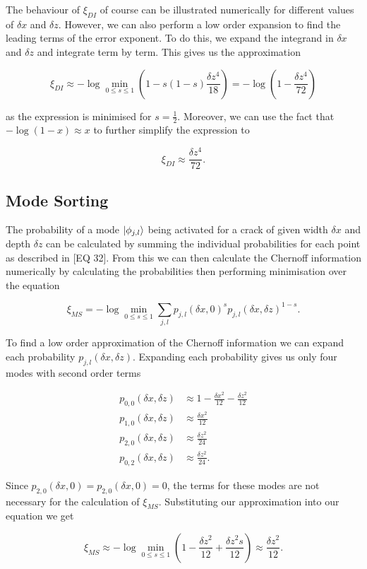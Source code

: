 \documentclass{article}
\begin{document}
The behaviour of $\xi_{DI}$ of course can be illustrated numerically for different values of $\delta x$ and $\delta z$.
However, we can also perform a low order expansion to find the leading terms of the error exponent.
To do this, we expand the integrand in $\delta x$ and $\delta z$ and integrate term by term.
This gives us the approximation

\begin{equation}
\xi_{DI} \approx - \log \min_{0 \leq s \leq 1} \left( 1 - s(1-s) \frac{\delta z^4}{18}\right) = -\log \left(1 - \frac{\delta z^4}{72} \right)
\end{equation}

as the expression is minimised for $s = \frac{1}{2}$.
Moreover, we can use the fact that $-\log(1-x) \approx x$ to further simplify the expression to

\begin{equation}
\xi_{DI} \approx \frac{\delta z^4}{72}.
\end{equation}

\subsection*{Mode Sorting}

The probability of a mode $\ket{\phi_{j,l}}$ being activated for a crack of given width $\delta x$ and depth $\delta z$ can be calculated by summing the individual probabilities for each point as described in [EQ 32]. From this we can then calculate the Chernoff information numerically by calculating the probabilities then performing minimisation over the equation

\begin{equation}
\xi_{MS} = -\log \min_{0 \leq s \leq 1} \sum_{j,l} p_{j,l}(\delta x, 0)^s p_{j,l}(\delta x, \delta z)^{1-s}.
\end{equation}

To find a low order approximation of the Chernoff information we can expand each probability $p_{j,l}(\delta x, \delta z)$. Expanding each probability gives us only four modes with second order terms

\begin{equation}
	\begin{aligned}
		p_{0,0}(\delta x, \delta z)& \approx 1 - \frac{\delta x^2}{12} - \frac{\delta z^2}{12}\\
		p_{1,0}(\delta x, \delta z)& \approx \frac{\delta x^2}{12}\\
		p_{2,0}(\delta x, \delta z)& \approx \frac{\delta z^2}{24}\\
		p_{0,2}(\delta x, \delta z)& \approx \frac{\delta z^2}{24}.
	\end{aligned}
\end{equation}

Since $p_{2,0}(\delta x, 0) = p_{2,0}(\delta x, 0) = 0$, the terms for these modes are not necessary for the calculation of  $\xi_{MS}$.
Substituting our approximation into our equation we get

\begin{equation}
\xi_{MS} \approx -\log \min_{0 \leq s \leq 1} \left(1  - \frac{\delta z^2}{12} + \frac{\delta z^2 s}{12} \right) \approx \frac{\delta z^2}{12}.
\end{equation}
\end{document}
